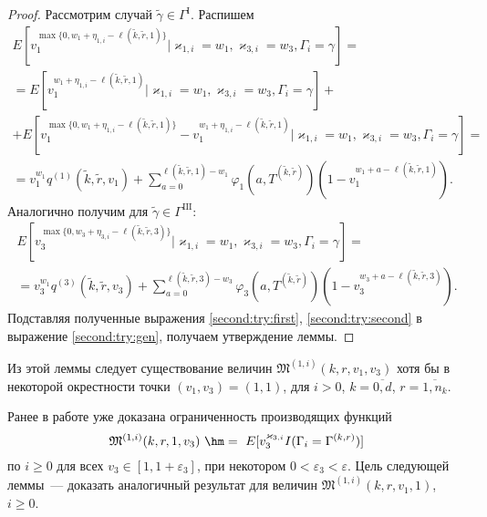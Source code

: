 \begin{proof}
Рассмотрим случай $\tilde{\gamma}\in \Gamma^{\mathrm{I}}$. Распишем 
\begin{multline}
    E[v_1^{\max{\{0,  w_1 + \eta_{1, i} - \ell(\tilde{k}, \tilde{r}, 1)\}}} | \varkappa_{1, i}=w_1, \varkappa_{3, i}=w_3,  \Gamma_i=\gamma] = \\ =
    E[v_1^{ w_1 + \eta_{1, i} - \ell(\tilde{k}, \tilde{r}, 1)} | \varkappa_{1, i}=w_1, \varkappa_{3, i}=w_3,  \Gamma_i=\gamma] + \\ +
     E[v_1^{\max{\{0,  w_1 + \eta_{1, i} - \ell(\tilde{k}, \tilde{r}, 1)\}}} - v_1^{ w_1 + \eta_{1, i} - \ell(\tilde{k}, \tilde{r}, 1)} | \varkappa_{1, i}=w_1, \varkappa_{3, i}=w_3,  \Gamma_i=\gamma] = \\ =
      v_1^{w_1} q^{(1)}(\tilde{k}, \tilde{r}, v_1) +
     \sum_{a=0}^{\ell(\tilde{k}, \tilde{r}, 1) - w_1} \varphi_1(a, T^{(\tilde{k}, \tilde{r})})(1-v_1^{w_1+a-\ell(\tilde{k}, \tilde{r}, 1)}).
\label{second:try:first}
\end{multline}
Аналогично получим для  $\tilde{\gamma}\in \Gamma^{\mathrm{III}}$:
\begin{multline}
    E[v_3^{\max{\{0,  w_3 + \eta_{3, i} - \ell(\tilde{k}, \tilde{r}, 3)\}}} | \varkappa_{1, i}=w_1, \varkappa_{3, i}=w_3,  \Gamma_i=\gamma] = \\ =
     v_3^{w_1} q^{(3)}(\tilde{k}, \tilde{r}, v_3) +
     \sum_{a=0}^{\ell(\tilde{k}, \tilde{r}, 3) - w_3} \varphi_3(a, T^{(\tilde{k}, \tilde{r})})(1-v_3^{w_3+a-\ell(\tilde{k}, \tilde{r}, 3)}).
\label{second:try:second}
\end{multline}
Подставляя полученные выражения \eqref{second:try:first},  \eqref{second:try:second} в выражение  \eqref{second:try:gen},  получаем утверждение леммы.
\end{proof}

Из этой леммы следует существование величин $\mathfrak{M}^{(1, i)}(k,  r, v_1, v_3)$ хотя бы в некоторой окрестности точки $(v_1, v_3)=(1, 1)$,  для $i>0$,  $k=\overline{0,d}$,  $r=\overline{1,n_{k}}$.

Ранее в работе уже доказана ограниченность  производящих функций
$$\mathfrak{M}^{(1,i)}(k,r,1,v_3)~\hm= ~E[v_3^{\varkappa_{3,i}}{I(\Gamma_{i}=\Gamma^{(k,r)})}]
$$ по $i\geqslant 0$ для всех $v_3\in [1,1+\varepsilon_3]$, при некотором $0 < \varepsilon_3 < \varepsilon$. Цель следующей леммы~--- доказать аналогичный результат для величин $\mathfrak{M}^{(1,i)}(k,r,v_1,1)$, $i\geqslant 0$.

